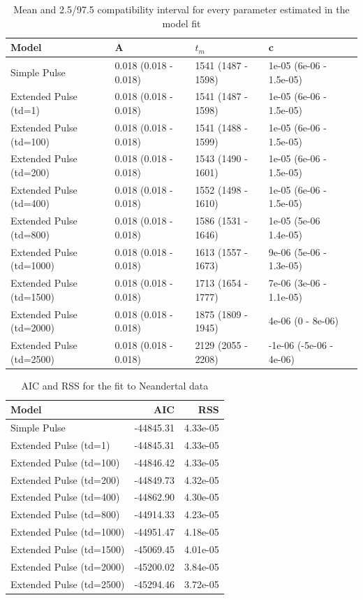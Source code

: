 \documentclass[11pt]{article}
\begin{document}
\begin{table}[H]
\caption{\label{tab:tableS2} Mean and 2.5/97.5 compatibility interval for every parameter estimated in the model fit}
\centering
\begin{tabular}[t]{l|l|l|l|l}
\hline
Model & A & $t_m$ & c\\
\hline
Simple Pulse & 0.018 (0.018 - 0.018) & 1541 (1487 - 1598) & 1e-05 (6e-06 - 1.5e-05)\\
\hline
Extended Pulse (td=1) & 0.018 (0.018 - 0.018) & 1541 (1487 - 1598) & 1e-05 (6e-06 - 1.5e-05)\\
\hline
Extended Pulse (td=100) & 0.018 (0.018 - 0.018) & 1541 (1488 - 1599) & 1e-05 (6e-06 - 1.5e-05)\\
\hline
Extended Pulse (td=200) & 0.018 (0.018 - 0.018) & 1543 (1490 - 1601) & 1e-05 (6e-06 - 1.5e-05)\\
\hline
Extended Pulse (td=400) & 0.018 (0.018 - 0.018) & 1552 (1498 - 1610) & 1e-05 (6e-06 - 1.5e-05)\\
\hline
Extended Pulse (td=800) & 0.018 (0.018 - 0.018) & 1586 (1531 - 1646) & 1e-05 (5e-06 1.4e-05)\\
\hline
Extended Pulse (td=1000) & 0.018 (0.018 - 0.018) & 1613 (1557 - 1673) & 9e-06 (5e-06 - 1.3e-05)\\
\hline
Extended Pulse (td=1500) &  0.018 (0.018 - 0.018) & 1713 (1654 - 1777) & 7e-06 (3e-06 - 1.1e-05)\\
\hline
Extended Pulse (td=2000) & 0.018 (0.018 - 0.018) & 1875 (1809 - 1945) & 4e-06 (0 - 8e-06)\\
\hline
Extended Pulse (td=2500) & 0.018 (0.018 - 0.018) & 2129 (2055 - 2208) & -1e-06 (-5e-06 - 4e-06)\\
\hline
\end{tabular}
\end{table}

\begin{table}[H]

\caption{\label{tab:tableS2_2}\label{tab:tableS2} AIC and RSS for the fit to Neandertal data}
\centering
\begin{tabular}[t]{l|r|r}
\hline
Model & AIC & RSS\\
\hline
Simple Pulse & -44845.31 & 4.33e-05\\
\hline
Extended Pulse (td=1) & -44845.31 & 4.33e-05\\
\hline
Extended Pulse (td=100) & -44846.42 & 4.33e-05\\
\hline
Extended Pulse (td=200) & -44849.73 & 4.32e-05\\
\hline
Extended Pulse (td=400) & -44862.90 & 4.30e-05\\
\hline
Extended Pulse (td=800) & -44914.33 & 4.23e-05\\
\hline
Extended Pulse (td=1000) & -44951.47 & 4.18e-05\\
\hline
Extended Pulse (td=1500) & -45069.45 & 4.01e-05\\
\hline
Extended Pulse (td=2000) & -45200.02 & 3.84e-05\\
\hline
Extended Pulse (td=2500) & -45294.46 & 3.72e-05\\
\hline
\end{tabular}
\end{table}
\end{document}
